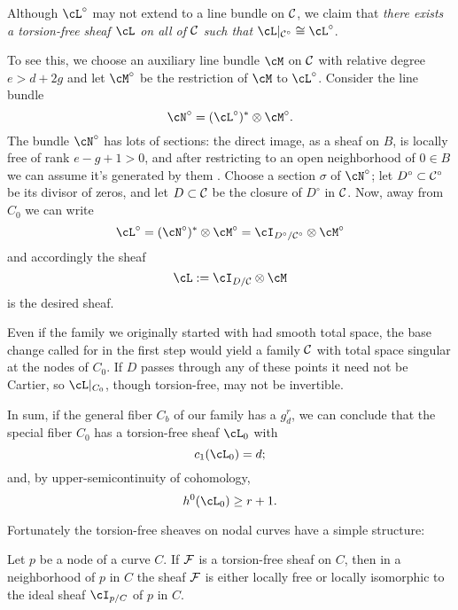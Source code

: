 %

Although  $\cL^\circ$ may not extend to a line bundle on $\cC$, we claim that \emph{there exists a torsion-free sheaf $\cL$ on all of $\cC$ such that $\cL|_{\cC^\circ} \cong \cL^\circ$}.

To see this, we choose an auxiliary line bundle $\cM$ on $\cC$ with relative degree $e > d + 2g$ and let $\cM^\circ$ be the restriction of $\cM$ to $\cL^\circ$. Consider the line bundle 
$$
\cN^\circ = (\cL^\circ)^* \otimes \cM^\circ.
$$
The bundle $\cN^\circ$ has lots of sections: the direct image, as a sheaf on $B$, is locally free of rank $e-g+1 > 0$, and after restricting to an open neighborhood of $0 \in B$ we can assume it's generated by them . Choose a section $\sigma$ of $\cN^\circ$; let $D^\circ \subset \cC^\circ$ be its divisor of zeros, and let $D \subset \cC$ be the closure of $D^\circ$ in $\cC$. Now, away from $C_0$ we can write
$$
\cL^\circ = (\cN^\circ)^* \otimes \cM^\circ = \cI_{D^\circ/\cC^\circ} \otimes \cM^\circ
$$
and accordingly the sheaf
$$
\cL := \cI_{D/\cC} \otimes \cM
$$
is the desired sheaf. 

Even if the family we originally started with had smooth total space, the base change called for in the first step would yield a family $\cC$ with  total space singular at the nodes of $C_0$. If $D$ passes through any of these points it need not be Cartier, 
so $\cL|_{C_0}$, though torsion-free, may not be invertible.

In sum, if the general fiber $C_b$ of our family has a $g^r_d$, we can conclude that the special fiber $C_0$ has a torsion-free sheaf $\cL_0$ with 
$$
c_1(\cL_0) = d;
$$
and, by upper-semicontinuity of cohomology,
$$
h^0(\cL_0) \geq r+1.
$$

Fortunately the torsion-free sheaves on nodal curves have a simple structure: 

\begin{lemma}\label{torsion free at node}
Let $p$ be a  node of a curve $C$. If $\cF$ is a torsion-free sheaf on $C$, then in a neighborhood of $p$ in $C$ the sheaf $\cF$ is either locally free or locally isomorphic to the ideal sheaf $\cI_{p/C}$ of $p$ in $C$.
\end{lemma}

